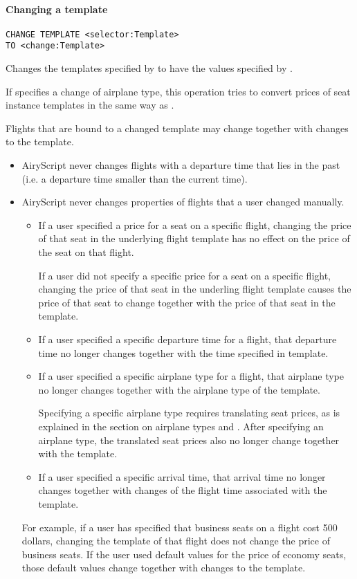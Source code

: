 \paragraph{Changing a template}
\begin{operation}
  \begin{lstlisting}
CHANGE TEMPLATE <selector:Template>
TO <change:Template>
  \end{lstlisting}
\end{operation}
Changes the templates specified by  to have the values specified
by .

If  specifies a change of airplane type, this operation tries to
convert prices of seat instance templates in the same way as
.

Flights that are bound to a changed template may change together with changes to
the template.
\begin{itemize}
  \item AiryScript never changes flights with a departure time that lies in the
    past (i.e. a departure time smaller than the current time).
  \item AiryScript never changes properties of flights that a user changed
    manually.
    \begin{itemize}
      \item If a user specified a price for a seat on a specific flight,
        changing the price of that seat in the underlying flight template has no
        effect on the price of the seat on that flight.

        If a user did not specify a specific price for a seat on a specific
        flight, changing the price of that seat in the underling flight template
        causes the price of that seat to change together with the price of that
        seat in the template.
      \item If a user specified a specific departure time for a flight, that
        departure time no longer changes together with the time specified in
        template.
      \item If a user specified a specific airplane type for a flight, that
        airplane type no longer changes together with the airplane
        type of the template.

        Specifying a specific airplane type requires translating seat prices, as
        is explained in the section on airplane types and .
        After specifying an airplane type, the translated seat prices also no
        longer change together with the template.
      \item If a user specified a specific arrival time, that arrival time no
        longer changes together with changes of the flight time associated with
        the template.
    \end{itemize}
    
    For example, if a user has specified that business seats on a
    flight cost 500 dollars, changing the template of that flight does not
    change the price of business seats. If the user used default values for the
    price of economy seats, those default values change together with changes to
    the template.
\end{itemize}
